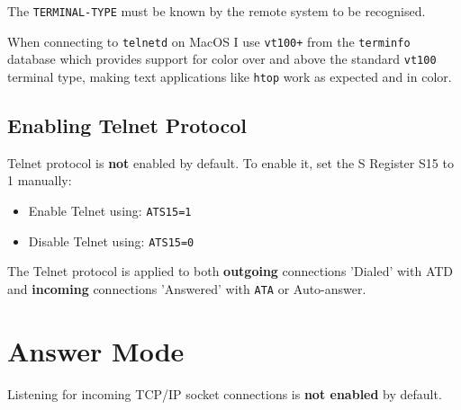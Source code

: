 The \texttt{TERMINAL-TYPE} must be known by the remote system to be recognised.

When connecting to \texttt{telnetd} on MacOS I use \texttt{vt100+} from the \texttt{terminfo} database which provides support for color over and above the standard
\texttt{vt100} terminal type, making text applications like \texttt{htop} work as expected and in color.

\subsection{Enabling Telnet Protocol}

Telnet protocol is \textbf{not} enabled by default. To enable it, set the S Register S15 to 1 manually:

\begin{itemize}[leftmargin=1em]
	\item Enable Telnet using: \texttt{ATS15=1}
	\item Disable Telnet using: \texttt{ATS15=0}
\end{itemize}

The Telnet protocol is applied to both \textbf{outgoing} connections 'Dialed' with ATD and \textbf{incoming} connections 'Answered' with \texttt{ATA} or Auto-answer.


\newpage
\section{Answer Mode}

Listening for incoming TCP/IP socket connections is \textbf{not enabled} by default.


